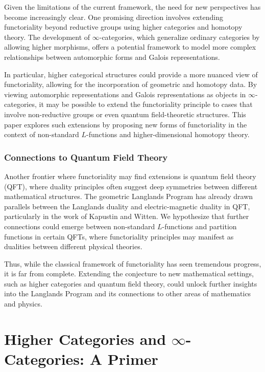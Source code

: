 \documentclass{article}
\theoremstyle{remark}
\begin{document}
Given the limitations of the current framework, the need for new perspectives has become increasingly clear. One promising direction involves extending functoriality beyond reductive groups using higher categories and homotopy theory. The development of $\infty$-categories, which generalize ordinary categories by allowing higher morphisms, offers a potential framework to model more complex relationships between automorphic forms and Galois representations.

In particular, higher categorical structures could provide a more nuanced view of functoriality, allowing for the incorporation of geometric and homotopy data. By viewing automorphic representations and Galois representations as objects in $\infty$-categories, it may be possible to extend the functoriality principle to cases that involve non-reductive groups or even quantum field-theoretic structures. This paper explores such extensions by proposing new forms of functoriality in the context of non-standard $L$-functions and higher-dimensional homotopy theory.

\subsubsection{Connections to Quantum Field Theory}

Another frontier where functoriality may find extensions is quantum field theory (QFT), where duality principles often suggest deep symmetries between different mathematical structures. The geometric Langlands Program has already drawn parallels between the Langlands duality and electric-magnetic duality in QFT, particularly in the work of Kapustin and Witten. We hypothesize that further connections could emerge between non-standard $L$-functions and partition functions in certain QFTs, where functoriality principles may manifest as dualities between different physical theories.

Thus, while the classical framework of functoriality has seen tremendous progress, it is far from complete. Extending the conjecture to new mathematical settings, such as higher categories and quantum field theory, could unlock further insights into the Langlands Program and its connections to other areas of mathematics and physics.

\section{Higher Categories and $\infty$-Categories: A Primer}
\end{document}
